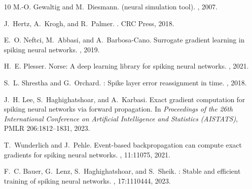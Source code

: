 \documentclass[10pt,twocolumn]{article}
\begin{document}
\begin{thebibliography}{10}
M.-O. Gewaltig and M.~Diesmann.
 (neural simulation tool).
, 2007.

\bibitem[{Hertz}(2018)}]{hertz2018intro}
J.~Hertz, A.~Krogh, and R.~Palmer.
.
\newblock CRC Press, 2018.

E.~O. Neftci, M.~Abbasi, and A.~Barbosa-Cano.
\newblock Surrogate gradient learning in spiking neural networks.
, 2019.

H.~E. Plesser.
\newblock Norse: A deep learning library for spiking neural networks.
, 2021.

S.~L. Shrestha and G.~Orchard.
: Spike layer error reassignment in time.
, 2018.

J.~H. Lee, S.~Haghighatshoar, and A.~Karbasi.
\newblock Exact gradient computation for spiking neural networks via
  forward propagation.
\newblock In {\em Proceedings of the 26th International Conference on
  Artificial Intelligence and Statistics (AISTATS)}, PMLR 206:1812--1831, 2023.

T.~Wunderlich and J.~Pehle.
\newblock Event-based backpropagation can compute exact gradients for spiking
  neural networks.
, 11:11075, 2021.

F.~C. Bauer, G.~Lenz, S.~Haghighatshoar, and S.~Sheik.
: Stable and efficient training of spiking neural networks.
, 17:1110444, 2023.

\end{thebibliography}
\end{document}
